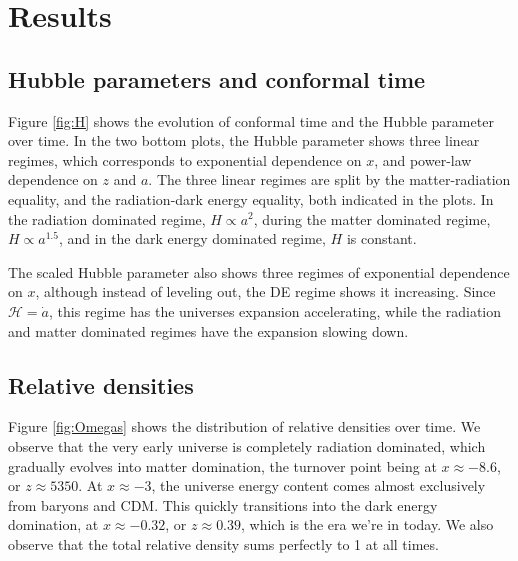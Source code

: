 \documentclass[10pt, a4paper]{article}
\begin{document}
\section{Results}
\subsection{Hubble parameters and conformal time}
Figure \ref{fig:H} shows the evolution of conformal time and the Hubble parameter over time. In the two bottom plots, the Hubble parameter shows three linear regimes, which corresponds to exponential dependence on $x$, and power-law dependence on $z$ and $a$. The three linear regimes are split by the matter-radiation equality, and the radiation-dark energy equality, both indicated in the plots. In the radiation dominated regime, $H \propto a^2$, during the matter dominated regime, $H \propto a^{1.5}$, and in the dark energy dominated regime, $H$ is constant.

The scaled Hubble parameter also shows three regimes of exponential dependence on $x$, although instead of leveling out, the DE regime shows it increasing. Since $\mathcal{H} = \dot{a}$, this regime has the universes expansion accelerating, while the radiation and matter dominated regimes have the expansion slowing down.

\subsection{Relative densities}
Figure \ref{fig:Omegas} shows the distribution of relative densities over time. We observe that the very early universe is completely radiation dominated, which gradually evolves into matter domination, the turnover point being at $x\approx-8.6$, or $z\approx 5350$. At $x\approx-3$, the universe energy content comes almost exclusively from baryons and CDM. This quickly transitions into the dark energy domination, at $x\approx -0.32$, or $z\approx 0.39$, which is the era we're in today. We also observe that the total relative density sums perfectly to 1 at all times.
\end{document}
